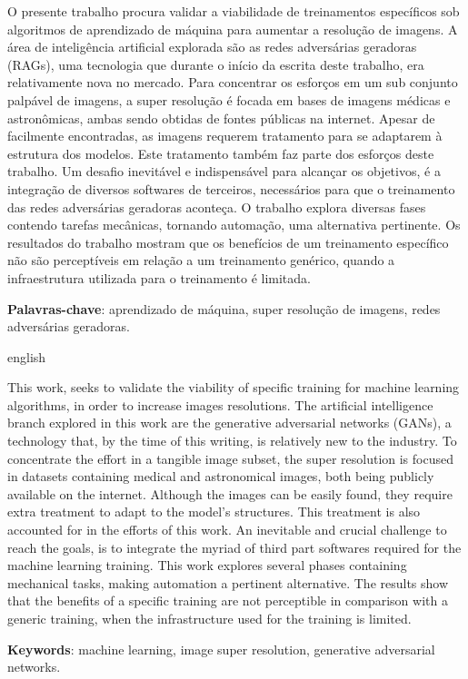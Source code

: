 \documentclass[
	11pt,
	openright,
	oneside,
	a4paper,
	english,
	french,
	spanish,
	brazil,	
	]{abntex2}
\begin{document}
\setlength{\absparsep}{18pt} 
\begin{resumo}

\noindent 

O presente trabalho procura validar a viabilidade de treinamentos específicos sob algoritmos de aprendizado de máquina para aumentar a resolução de imagens. A área de inteligência artificial explorada são as redes adversárias geradoras (RAGs), uma tecnologia que durante o início da escrita deste trabalho, era relativamente nova no mercado. Para concentrar os esforços em um sub conjunto palpável de imagens, a super resolução é focada em bases de imagens médicas e astronômicas, ambas sendo obtidas de fontes públicas na internet. Apesar de facilmente encontradas, as imagens requerem tratamento para se adaptarem à estrutura dos modelos. Este tratamento também faz parte dos esforços deste trabalho. Um desafio inevitável e indispensável para alcançar os objetivos, é a integração de diversos softwares de terceiros, necessários para que o treinamento das redes adversárias geradoras aconteça. O trabalho explora diversas fases contendo tarefas mecânicas, tornando automação, uma alternativa pertinente. Os resultados do trabalho mostram que os benefícios de um treinamento específico não são perceptíveis em relação a um treinamento genérico, quando a infraestrutura utilizada para o treinamento é limitada. 

\noindent 
\textbf{Palavras-chave}: aprendizado de máquina, super resolução de imagens, redes adversárias geradoras.

\end{resumo}

\begin{resumo}[Abstract]
\begin{otherlanguage*}{english}

\noindent 

This work, seeks to validate the viability of specific training for machine learning algorithms, in order to increase images resolutions. The artificial intelligence branch explored in this work are the generative adversarial networks (GANs), a technology that, by the time of this writing, is relatively new to the industry. To concentrate the effort in a tangible image subset, the super resolution is focused in datasets containing medical and astronomical images, both being publicly available on the internet. Although the images can be easily found, they require extra treatment to adapt to the model's structures. This treatment is also accounted for in the efforts of this work. An inevitable and crucial challenge to reach the goals, is to integrate the myriad of third part softwares required for the machine learning training. This work explores several phases containing mechanical tasks, making automation a pertinent alternative. The results show that the benefits of a specific training are not perceptible in comparison with a generic training, when the infrastructure used for the training is limited.

\noindent  
\textbf{Keywords}: machine learning, image super resolution, generative adversarial networks.
\end{otherlanguage*}
\end{resumo}
\end{document}
